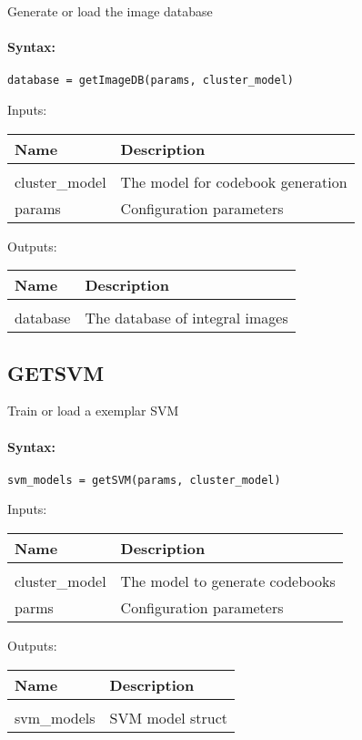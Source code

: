Generate or load the image database

\paragraph{Syntax:} \verb|database = getImageDB(params, cluster_model)|

Inputs:

\begin{tabular}{|l|p{5cm}|}
\hline
\textbf{Name} & \textbf{Description} \\
\hline \hline \\
cluster\_model & The model for codebook generation  \\ \hline
params & Configuration parameters  \\ \hline
\end{tabular}
Outputs:

\begin{tabular}{|l|p{5cm}|}
\hline
\textbf{Name} & \textbf{Description} \\
\hline \hline \\
database & The database of integral images  \\ \hline
\end{tabular}

\subsection{GETSVM}

Train or load a exemplar SVM

\paragraph{Syntax:} \verb|svm_models = getSVM(params, cluster_model)|

Inputs:

\begin{tabular}{|l|p{5cm}|}
\hline
\textbf{Name} & \textbf{Description} \\
\hline \hline \\
cluster\_model & The model to generate codebooks  \\ \hline
parms & Configuration parameters  \\ \hline
\end{tabular}
Outputs:

\begin{tabular}{|l|p{5cm}|}
\hline
\textbf{Name} & \textbf{Description} \\
\hline \hline \\
svm\_models & SVM model struct  \\ \hline
\end{tabular}

